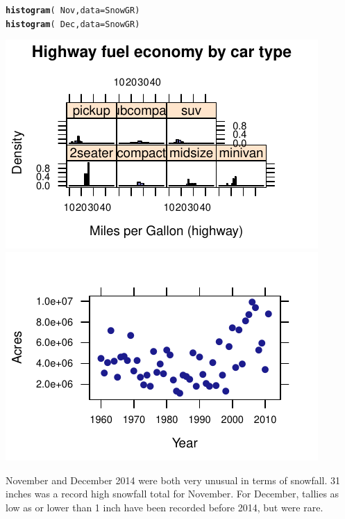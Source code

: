 \documentclass[twoside]{book}\usepackage[]{graphicx}\usepackage[]{xcolor}
\makeatletter
\def\maxwidth{ %
  \ifdim\Gin@nat@width>\linewidth
    \linewidth
  \else
    \Gin@nat@width
  \fi
}
\newcommand{\hlopt}[1]{\textcolor[rgb]{0,0,0}{#1}}%
\newcommand{\hlstd}[1]{\textcolor[rgb]{0.345,0.345,0.345}{#1}}%
\newcommand{\hlkwc}[1]{\textcolor[rgb]{0.333,0.667,0.333}{#1}}%
\newcommand{\hlkwd}[1]{\textcolor[rgb]{0.737,0.353,0.396}{\textbf{#1}}}%
\newenvironment{kframe}{%
 \def\at@end@of@kframe{}%
 \ifinner\ifhmode%
  \def\at@end@of@kframe{\end{minipage}}%
  \begin{minipage}{\columnwidth}%
 \fi\fi%
 \def\FrameCommand##1{\hskip\@totalleftmargin \hskip-\fboxsep
 \colorbox{shadecolor}{##1}\hskip-\fboxsep
     \hskip-\linewidth \hskip-\@totalleftmargin \hskip\columnwidth}%
 \MakeFramed {\advance\hsize-\width
   \@totalleftmargin\z@ \linewidth\hsize
   \@setminipage}}%
 {\par\unskip\endMakeFramed%
 \at@end@of@kframe}
\newenvironment{knitrout}{}{} %
\makeatother
\begin{document}
\begin{solution}
\begin{knitrout}
\color{fgcolor}\begin{kframe}
\begin{alltt}
\hlkwd{histogram}\hlstd{(}\hlopt{~}\hlstd{Nov,} \hlkwc{data} \hlstd{= SnowGR)}
\hlkwd{histogram}\hlstd{(}\hlopt{~}\hlstd{Dec,} \hlkwc{data} \hlstd{= SnowGR)}
\end{alltt}
\end{kframe}

{\centering \includegraphics[width=\maxwidth]{figures/fig-unnamed-chunk-28-1} 
\includegraphics[width=\maxwidth]{figures/fig-unnamed-chunk-28-2} 

}



\end{knitrout}
November and December 2014 were both very unusual in terms of snowfall. 31 inches was a record high snowfall
total for November.  For December, tallies as low as or lower than 1 inch have been recorded before 2014, 
but were rare.


\end{solution}
\end{document}
